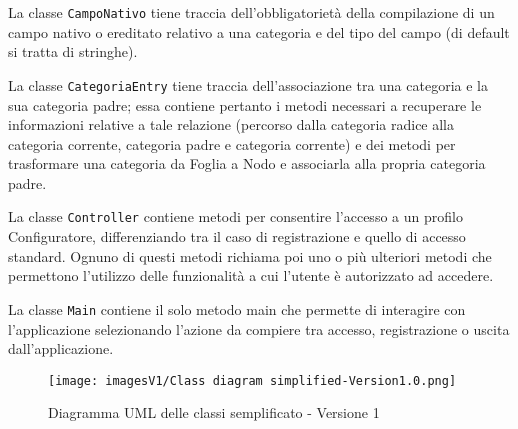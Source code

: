 La classe \texttt{CampoNativo} tiene traccia dell'obbligatorietà della compilazione di un campo nativo o ereditato relativo a una categoria e del tipo del campo (di default si tratta di stringhe). 

La classe \texttt{CategoriaEntry} tiene traccia dell'associazione tra una categoria e la sua categoria padre; essa contiene pertanto i metodi necessari a recuperare le informazioni relative a tale relazione (percorso dalla categoria radice alla categoria corrente, categoria padre e categoria corrente) e dei metodi per trasformare una categoria da Foglia a Nodo e associarla alla propria categoria padre.

La classe \texttt{Controller} contiene metodi per consentire l'accesso a un profilo Configuratore, differenziando tra il caso di registrazione e quello di accesso standard. Ognuno di questi metodi richiama poi uno o più ulteriori metodi che permettono l'utilizzo delle funzionalità a cui l'utente è autorizzato ad accedere.

La classe \texttt{Main} contiene il solo metodo main che permette di interagire con l'applicazione selezionando l'azione da compiere tra accesso, registrazione o uscita dall'applicazione.

\begin{figure}[!]
    \centering
    \texttt{[image: imagesV1/Class diagram simplified-Version1.0.png]}
    \caption{\label{fig:Simplified Class Diagram - v1}Diagramma UML delle classi semplificato - Versione 1}
\end{figure}